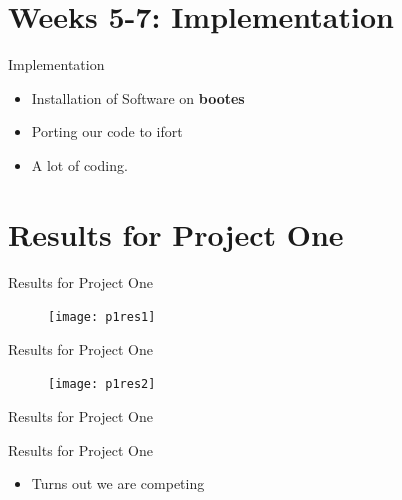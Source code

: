 \documentclass{beamer}
\begin{document}

    \section{Weeks 5-7: Implementation}

    \begin{frame}{Implementation}
    \begin{itemize}[<+->]
        \item Installation of Software on \bf{bootes}
        \item Porting our code to ifort
        \item A lot of coding.
    \end{itemize}
    \end{frame}


    \section{Results for Project One}

    \begin{frame}{Results for Project One}
    \begin{figure}[h!]
        \centering
        \texttt{[image: p1res1]}
    \end{figure}
    \end{frame}

    \begin{frame}{Results for Project One}
    \begin{figure}[h!]
        \centering
        \texttt{[image: p1res2]}
    \end{figure}
    \end{frame}

    \begin{frame}{Results for Project One}
    \end{frame}

    \begin{frame}{Results for Project One}
        \begin{itemize}[<+->]
            \item Turns out we are competing 
        \end{itemize}

    \end{frame}
\end{document}
